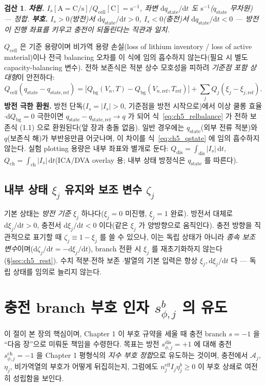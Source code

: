 \documentclass[11pt,a4paper]{article}
\newtheorem*{verifybox}{검산}
\newcommand{\dd}{\mathrm{d}}
\newcommand{\eff}{\mathrm{eff}}
\newcommand{\cell}{\mathrm{cell}}
\newcommand{\bg}{\mathrm{bg}}
\newcommand{\dis}{\mathrm{dis}}
\newcommand{\chg}{\mathrm{ch}}
\newcommand{\stt}{\mathrm{state}}
\begin{document}
\begin{verifybox}
\textbf{차원.} $I_s[\mathrm A=\mathrm{C/s}]/Q_\cell[\mathrm C]=\mathrm{s^{-1}}$, 좌변 $\dd q_\stt/\dd t$ 도
$\mathrm{s^{-1}}$($q_\stt$ 무차원) — 정합. \textbf{부호.} $I_s>0$(방전)서 $\dd q_\stt/\dd t>0$, $I_s<0$(충전)서
$\dd q_\stt/\dd t<0$ — 방전이 진행 좌표를 키우고 충전이 되돌린다는 직관과 일치.
\end{verifybox}

$Q_\cell$ 은 기준 용량이며 비가역 용량 손실(loss of lithium inventory / loss of active material)이나 전극 balancing
오차를 이 식에 임의 흡수하지 않는다(필요 시 별도 capacity-balancing 변수). 전하 보존식은 적분 상수 모호성을 피하려
\emph{기준점 포함 상대형}이 안전하다:
\begin{equation}
Q_\cell(q_\stt-q_{\stt,\mathrm{ref}})=\big[Q_\bg(V_n,T)-Q_\bg(V_{n,\mathrm{ref}},T_{\mathrm{ref}})\big]
+\sum_j Q_j(\xi_j-\xi_{j,\mathrm{ref}}).
\label{eq:ch5_relbalance}
\end{equation}
\textbf{방전 극한 환원.} 방전 단독($I_s=|I_s|>0$, 기준점을 방전 시작으로)에서 이상 쿨롱 효율$\cdot$$\dd Q_\bg=0$
극한이면 $q_\stt-q_{\stt,\mathrm{ref}}\to q$ 가 되어 식~\eqref{eq:ch5_relbalance} 가 전하 보존식 (1.1)
으로 환원된다(앞 장과 충돌 없음). 일반 경우에는 $q_\stt$(외부 전류 적분)와 $q$(보존식 해)가 부반응만큼 어긋나며,
이 차이를 식~\eqref{eq:ch5_qstate} 에 임의 흡수하지 않는다. 실험 plotting 용량은 내부 좌표와 별개로 둔다:
$Q_\dis=\int_\dis|I_s|\,\dd t$, $Q_\chg=\int_\chg|I_s|\,\dd t$(ICA/DVA overlay 용; 내부 상태 방정식은 $q_\stt$ 를
따른다).

\subsection{내부 상태 $\xi_j$ 유지와 보조 변수 $\zeta_j$}\label{sec:ch5_xikeep}
기본 상태는 \emph{방전 기준} $\xi_j$ 하나다($\xi_j=0$ 미진행, $\xi_j=1$ 완료). 방전서 대체로 $\dd\xi_j/\dd t>0$,
충전서 $\dd\xi_j/\dd t<0$ 이다(같은 $\xi_j$ 가 양방향으로 움직인다). 충전 방향을 직관적으로 표기할 때
$\zeta_j\equiv1-\xi_j$ 를 쓸 수 있으나, 이는 독립 상태가 아니라 \emph{종속 보조 변수}이며($\dd\zeta_j/\dd t=
-\dd\xi_j/\dd t$), branch 전환 시 $\xi_j$ 를 재초기화하지 않는다(\S\ref{sec:ch5_rest}). 수치 적분$\cdot$전하 보존
$\cdot$발열의 기본 입력은 항상 $\xi_j,\dd\xi_j/\dd t$ 다 — 독립 상태를 임의로 늘리지 않는다.

\section{충전 branch 부호 인자 $s_{\phi,j}^b$ 의 유도}\label{sec:ch5_chargesign}
이 절이 본 장의 핵심이며, Chapter 1 이 부호 규약을 세울 때 충전 branch $s=-1$ 을 ``다음 장''으로 미뤄둔 책임을
수령한다. 목표는 방전 $s_{\phi,j}^\dis=+1$ 에 대해 충전 $s_{\phi,j}^\chg=-1$ 을 Chapter 1 평형식의 \emph{지수 부호
정합}으로 유도하는 것이며, 충전에서 $\mathcal A_j$, $\eta_j$, 비가역열의 부호가 어떻게 뒤집히는지, 그럼에도
$n_j^{\eff}I_j\eta_j^b\ge0$ 이 부호 상쇄로 여전히 성립함을 보인다.
\end{document}
